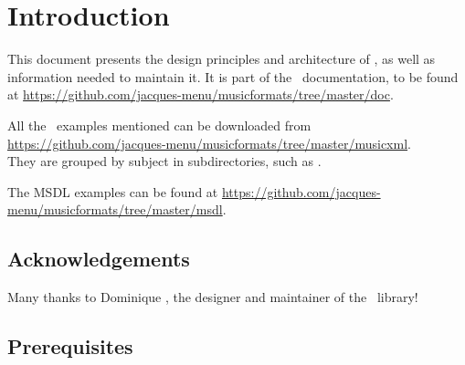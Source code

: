 



\chapter{Introduction}

This document presents the design principles and architecture of \mf, as well as information needed to maintain it. It is part of the \mf\ documentation, to be found at \url{https://github.com/jacques-menu/musicformats/tree/master/doc}.

All the \mxml\ examples mentioned can be downloaded from \url{https://github.com/jacques-menu/musicformats/tree/master/musicxml}.\\
They are grouped by subject in subdirectories, such as .

The MSDL examples can be found at \url{https://github.com/jacques-menu/musicformats/tree/master/msdl}.


\section{Acknowledgements}

Many thanks to Dominique \fober, the designer and maintainer of the \libmusicxml\ library!


\section{Prerequisites}


